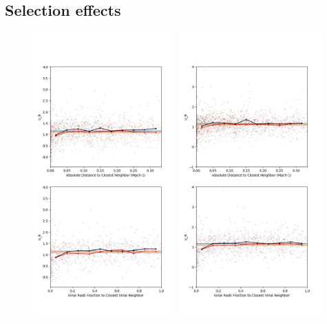 \subsection{Selection effects}

\begin{figure}
    \includegraphics[width=0.49\textwidth]{Images/smallScaleEnvironment/dwarf_ur_150}
    \includegraphics[width=0.49\textwidth]{Images/smallScaleEnvironment/dwarf_ur_600}

\end{figure}
